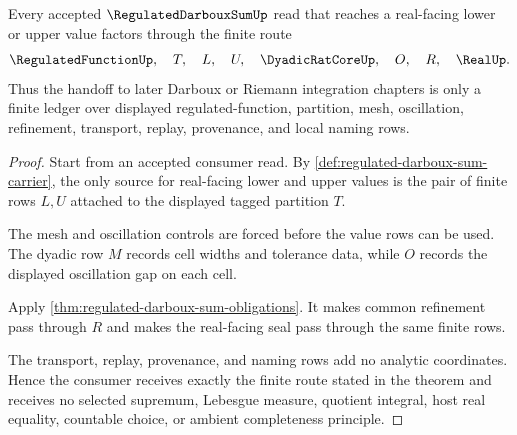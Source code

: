 \begin{theorem}
\label{thm:regulated-darboux-sum-finite-route}
Every accepted $\RegulatedDarbouxSumUp$ read that reaches a real-facing lower or upper value factors through the finite route
$$
\RegulatedFunctionUp,\quad
T,\quad
L,\quad
U,\quad
\DyadicRatCoreUp,\quad
O,\quad
R,\quad
\RealUp .
$$
Thus the handoff to later Darboux or Riemann integration chapters is only a finite ledger over displayed regulated-function, partition, mesh, oscillation, refinement, transport, replay, provenance, and local naming rows.
\end{theorem}
\begin{proof}
Start from an accepted consumer read. By \autoref{def:regulated-darboux-sum-carrier}, the only source for real-facing lower and upper values is the pair of finite rows $L,U$ attached to the displayed tagged partition $T$.

The mesh and oscillation controls are forced before the value rows can be used. The dyadic row $M$ records cell widths and tolerance data, while $O$ records the displayed oscillation gap on each cell.

Apply \autoref{thm:regulated-darboux-sum-obligations}. It makes common refinement pass through $R$ and makes the real-facing seal pass through the same finite rows.

The transport, replay, provenance, and naming rows add no analytic coordinates. Hence the consumer receives exactly the finite route stated in the theorem and receives no selected supremum, Lebesgue measure, quotient integral, host real equality, countable choice, or ambient completeness principle.
\end{proof}



